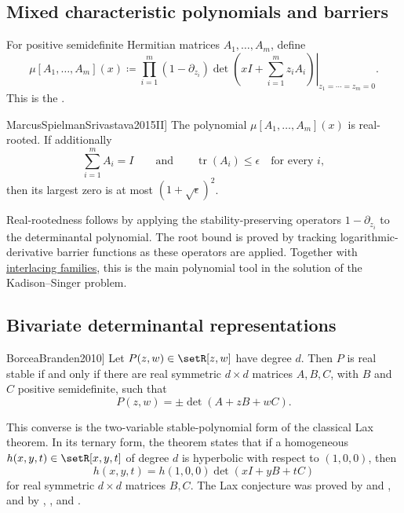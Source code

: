\subsection[mixedCharacteristicPolynomial]{Mixed characteristic polynomials and barriers}

For positive semidefinite Hermitian matrices $A_1,\dotsc,A_m$, define
\[
 \mu[A_1,\dotsc,A_m](x)
 \coloneqq
 \left.
 \prod_{i=1}^m(1-\partial_{z_i})
 \det\left(xI+\sum_{i=1}^m z_iA_i\right)
 \right|_{z_1=\dotsb=z_m=0}.
\]
This is the 
\label{mixedCharacteristicPolynomialDefinition}.

\begin{theorem}[Marcus--Spielman--Srivastava,
\cite[Cor.~4.4 and Thm.~5.1]{MarcusSpielmanSrivastava2015II}]
\label{mixedCharacteristicPolynomialBound}
The polynomial $\mu[A_1,\dotsc,A_m](x)$ is real-rooted.  If additionally
\[
  \sum_{i=1}^m A_i=I
  \qquad\text{and}\qquad
  \operatorname{tr}(A_i)\leq\epsilon\quad\text{for every $i$},
\]
then its largest zero is at most $(1+\sqrt{\epsilon})^2$.
\end{theorem}

Real-rootedness follows by applying the stability-preserving operators
$1-\partial_{z_i}$ to the determinantal polynomial.  The root bound is proved
by tracking logarithmic-derivative barrier functions as these operators are
applied.  Together with \hyperref[interlacingFamilies]{interlacing
families}, this is the main polynomial tool in the solution of the
Kadison--Singer problem.


\subsection[bivariateStableDeterminantalRepresentation]{Bivariate determinantal representations}

\begin{theorem}[Borcea--Brändén,
\cite[Thm.~1.13 and Cor.~6.7]{BorceaBranden2010}]
Let $P(z,w)\in\setR[z,w]$ have degree $d$.  Then $P$ is real stable if and
only if there are real symmetric $d\times d$ matrices $A,B,C$, with $B$ and
$C$ positive semidefinite, such that
\[
 P(z,w)=\pm\det(A+zB+wC).
\]
\end{theorem}

This converse is the two-variable stable-polynomial form of the classical Lax
theorem.  In its ternary form, the theorem states that if a homogeneous
$h(x,y,t)\in\setR[x,y,t]$ of degree $d$ is hyperbolic with respect to
$(1,0,0)$, then
\[
 h(x,y,t)=h(1,0,0)\det(xI+yB+tC)
\]
for real symmetric $d\times d$ matrices $B,C$.  The Lax conjecture was proved
by  and , and by
, , and 
\cite{HeltonVinnikov2007,LewisParriloRamana2005}.

